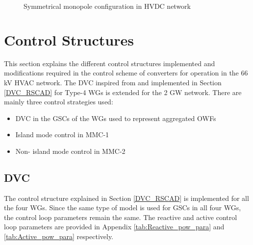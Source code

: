 \begin{figure}[H]
\centering





\caption{Symmetrical monopole configuration in HVDC network}

\end{figure}



\section{Control Structures}\label{control_structures}
This section explains the different control structures implemented and modifications required in the control scheme of converters for operation in the 66 kV \gls{HVAC} network. The \gls{DVC} inspired from \cite{erlich_new_2017} and implemented in Section \ref{DVC_RSCAD} for Type-4 \gls{WG}s is extended for the 2 GW network. There are mainly three control strategies used:
\begin{itemize}
    \item \gls{DVC} in the \gls{GSC}s of the \gls{WG}s used to represent aggregated \gls{OWF}s 
    \item Island mode control in \gls{MMC}-1
    \item Non- island mode control in \gls{MMC}-2
\end{itemize}

\subsection{DVC}
The control structure explained in Section \ref{DVC_RSCAD} is implemented for all the four \gls{WG}s. Since the same type of model is used for \gls{GSC}s in all four \gls{WG}s, the control loop parameters remain the same. The reactive and active control loop parameters are provided in Appendix \ref{tab:Reactive_pow_para} and \ref{tab:Active_pow_para} respectively.

